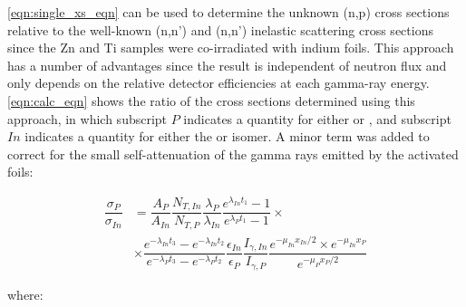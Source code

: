 \documentclass[5p]{elsarticle}
\begin{document}
\autoref{eqn:single_xs_eqn} can be used to determine the unknown (n,p) cross sections relative to the well-known (n,n') and (n,n') inelastic scattering cross sections since the Zn and Ti samples were co-irradiated with indium foils.
This approach has a number of advantages since the result is independent of neutron flux and only depends on the relative detector efficiencies at each gamma-ray energy.
 \autoref{eqn:calc_eqn} shows the ratio of the cross sections determined using this approach, in which subscript $P$ indicates a quantity for either  or , and subscript $In$ indicates a quantity for either the  or  isomer.
A minor term was added to correct for the small self-attenuation of the gamma rays emitted by the activated foils:



\begin{align}\label{eqn:calc_eqn}
\dfrac{\sigma_P}{\sigma_{In}} &=  \dfrac{A_P}{A_{In}} \dfrac{N_{T,In}}{N_{T,P}} \dfrac{\lambda_P}{\lambda_{In}} \dfrac{e^{\lambda_{In}t_1}-1}{e^{\lambda_{P}t_1}-1} \times \\
&\times \dfrac{e^{-\lambda_{In}t_3}-e^{-\lambda_{In}t_2}}{e^{-\lambda_{P}t_3} - e^{-\lambda_{P}t_2}} \dfrac{\epsilon_{In}}{\epsilon_P}  \dfrac{I_{\gamma,In}}{I_{\gamma,P}} \dfrac{e^{-\mu_{In}x_{In}/2}\times e^{-\mu_{In}x_{P}}}{e^{-\mu_{P}x_{P}/2}} \nonumber
\end{align}

where:
\end{document}

